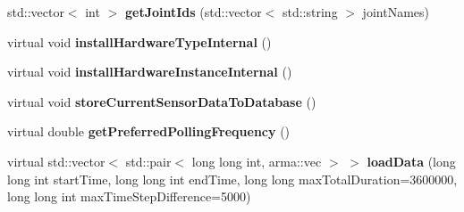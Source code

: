 \begin{DoxyCompactItemize}
\item 
std\+::vector$<$ int $>$ {\bfseries get\+Joint\+Ids} (std\+::vector$<$ std\+::string $>$ joint\+Names)\hypertarget{classkukadu_1_1ControlQueue_a0b4d383e644b9f96bcd820ce5de4ede0}{}\label{classkukadu_1_1ControlQueue_a0b4d383e644b9f96bcd820ce5de4ede0}

\item 
virtual void {\bfseries install\+Hardware\+Type\+Internal} ()\hypertarget{classkukadu_1_1ControlQueue_a268ab9493f8825784c4765002990fef1}{}\label{classkukadu_1_1ControlQueue_a268ab9493f8825784c4765002990fef1}

\item 
virtual void {\bfseries install\+Hardware\+Instance\+Internal} ()\hypertarget{classkukadu_1_1ControlQueue_ab8c2ae10f57d7589c96006ae881f449e}{}\label{classkukadu_1_1ControlQueue_ab8c2ae10f57d7589c96006ae881f449e}

\item 
virtual void {\bfseries store\+Current\+Sensor\+Data\+To\+Database} ()\hypertarget{classkukadu_1_1ControlQueue_a53eb51dd1ae778d7a449ae0b6752305e}{}\label{classkukadu_1_1ControlQueue_a53eb51dd1ae778d7a449ae0b6752305e}

\item 
virtual double {\bfseries get\+Preferred\+Polling\+Frequency} ()\hypertarget{classkukadu_1_1ControlQueue_a989bba841246f198e64176d2adad8127}{}\label{classkukadu_1_1ControlQueue_a989bba841246f198e64176d2adad8127}

\item 
virtual std\+::vector$<$ std\+::pair$<$ long long int, arma\+::vec $>$ $>$ {\bfseries load\+Data} (long long int start\+Time, long long int end\+Time, long long max\+Total\+Duration=3600000, long long int max\+Time\+Step\+Difference=5000)\hypertarget{classkukadu_1_1ControlQueue_a9bab2ac4a6a35f7ee728a8e126e2689c}{}\label{classkukadu_1_1ControlQueue_a9bab2ac4a6a35f7ee728a8e126e2689c}

\end{DoxyCompactItemize}
